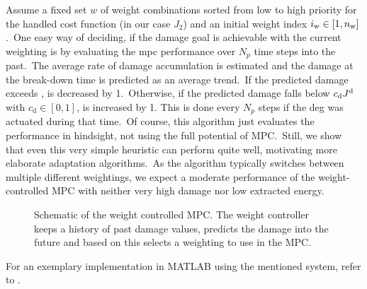 Assume a fixed set $w$ of \nw weight combinations sorted from low to high priority for the handled cost function (in our case $J_2$) and an initial weight index $i_\mathrm{w} \in [1, n_\mathrm{w}]$.\ 
One easy way of deciding, if the damage goal is achievable with the current weighting is by evaluating the \ac{mpc} performance over $N_p$ time steps into the past.\ 
The average rate of damage accumulation \Jps is estimated and the damage at the break-down time is predicted as an average trend.\
If the predicted damage exceeds \Jd, \iw is decreased by 1.\ 
Otherwise, if the predicted damage falls below $c_\mathrm{d}J^\mathrm{d}$ with $c_\mathrm{d}\in\left[0, 1\right]$, \iw is increased by 1.
This is done every $N_p$ steps if the \ac{deg} was actuated during that time.\
Of course, this algorithm just evaluates the performance in hindsight, not using the full potential of MPC.\ 
Still, we show that even this very simple heuristic can perform quite well, motivating more elaborate adaptation algorithms.\ 
As the algorithm typically switches between multiple different weightings, we expect a moderate performance of the weight-controlled MPC with neither very high damage nor low extracted energy.\

\begin{figure}[htb]
	\centering
	\fontsize{9}{0}\selectfont
	\def\svgwidth{0.49\textwidth}
	
	\caption{Schematic of the weight controlled MPC. The weight controller keeps a history of past damage values, predicts the damage into the future and based on this selects a weighting to use in the MPC.}
	\label{}
\end{figure}

%

For an exemplary implementation in MATLAB using the mentioned system, refer to .
